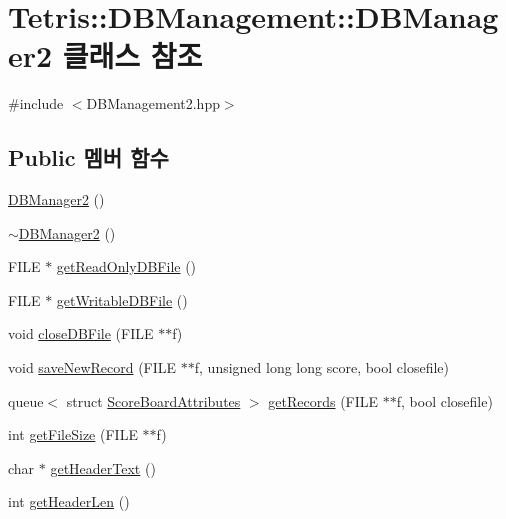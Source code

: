 \hypertarget{class_tetris_1_1_d_b_management_1_1_d_b_manager2}{}\section{Tetris\+:\+:D\+B\+Management\+:\+:D\+B\+Manager2 클래스 참조}
\label{class_tetris_1_1_d_b_management_1_1_d_b_manager2}


{\ttfamily \#include $<$D\+B\+Management2.\+hpp$>$}

\subsection*{Public 멤버 함수}
\begin{DoxyCompactItemize}
\item 
\hyperlink{class_tetris_1_1_d_b_management_1_1_d_b_manager2_a4f78fec881471a80eb86b55696af208a}{D\+B\+Manager2} ()
\item 
\hyperlink{class_tetris_1_1_d_b_management_1_1_d_b_manager2_aba92c26a0440d0785b3c725b60ebe32a}{$\sim$\+D\+B\+Manager2} ()
\item 
F\+I\+LE $\ast$ \hyperlink{class_tetris_1_1_d_b_management_1_1_d_b_manager2_a2d5133a870074bc297b8908856b9cd90}{get\+Read\+Only\+D\+B\+File} ()
\item 
F\+I\+LE $\ast$ \hyperlink{class_tetris_1_1_d_b_management_1_1_d_b_manager2_af2000011760bb3f7f3315d19e21372e0}{get\+Writable\+D\+B\+File} ()
\item 
void \hyperlink{class_tetris_1_1_d_b_management_1_1_d_b_manager2_aa275ad366e4301b97f26ebc799de7408}{close\+D\+B\+File} (F\+I\+LE $\ast$$\ast$f)
\item 
void \hyperlink{class_tetris_1_1_d_b_management_1_1_d_b_manager2_a25da0c1a6fa64b669f7e793c846961db}{save\+New\+Record} (F\+I\+LE $\ast$$\ast$f, unsigned long long score, bool closefile)
\item 
queue$<$ struct \hyperlink{struct_tetris_1_1_d_b_management_1_1_score_board_attributes}{Score\+Board\+Attributes} $>$ \hyperlink{class_tetris_1_1_d_b_management_1_1_d_b_manager2_a50f96af6082825b0a11b4090e9e863e1}{get\+Records} (F\+I\+LE $\ast$$\ast$f, bool closefile)
\item 
int \hyperlink{class_tetris_1_1_d_b_management_1_1_d_b_manager2_a0ad4e60d498caefce46d9917f7593c9e}{get\+File\+Size} (F\+I\+LE $\ast$$\ast$f)
\item 
char $\ast$ \hyperlink{class_tetris_1_1_d_b_management_1_1_d_b_manager2_a80b688a47f643121f2391f858d61ea13}{get\+Header\+Text} ()
\item 
int \hyperlink{class_tetris_1_1_d_b_management_1_1_d_b_manager2_acac0c763f7ff5fe5c5eda0c83e0b41bd}{get\+Header\+Len} ()
\end{DoxyCompactItemize}
